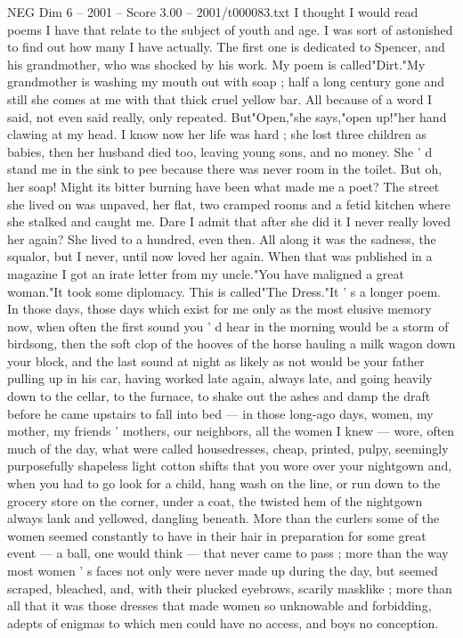 \begin{textsample}{NEG Dim 6 – 2001 – Score 3.00 – 2001/t000083.txt}  \label{ex:f6_neg_056}
I thought I would read poems I have that relate to the subject of youth and age.
I was sort of astonished to find out how many I have actually.
The first one is dedicated to Spencer, and his grandmother, who was shocked by his work.
My poem is called"Dirt."My grandmother is washing my mouth out with soap ; half a long century gone and still she comes at me with that thick cruel yellow bar.
All because of a word I said, not even said really, only repeated.
But"Open,"she says,"open up!"her hand clawing at my head.
I know now her life was hard ; she lost three children as babies, then her husband died too, leaving young sons, and no money.
She ' d stand me in the sink to pee because there was never room in the toilet.
But oh, her soap!
Might its bitter burning have been what made me a poet?
The street she lived on was unpaved, her flat, two cramped rooms and a fetid kitchen where she stalked and caught me.
Dare I admit that after she did it I never really loved her again?
She lived to a hundred, even then.
All along it was the sadness, the squalor, but I never, until now loved her again.
When that was published in a magazine I got an irate letter from my uncle."You have maligned a great woman."It took some diplomacy.
This is called"The Dress."It ' s a longer poem.
In those days, those days which exist for me only as the most elusive memory now, when often the first sound you ' d hear in the morning would be a storm of birdsong, then the soft clop of the hooves of the horse hauling a milk wagon down your block, and the last sound at night as likely as not would be your father pulling up in his car, having worked late again, always late, and going heavily down to the cellar, to the furnace, to shake out the ashes and damp the draft before he came upstairs to fall into bed — in those long-ago days, women, my mother, my friends ' mothers, our neighbors, all the women I knew — wore, often much of the day, what were called housedresses, cheap, printed, pulpy, seemingly purposefully shapeless light cotton shifts that you wore over your nightgown and, when you had to go look for a child, hang wash on the line, or run down to the grocery store on the corner, under a coat, the twisted hem of the nightgown always lank and yellowed, dangling beneath.
More than the curlers some of the women seemed constantly to have in their hair in preparation for some great event — a ball, one would think — that never came to pass ; more than the way most women ' s faces not only were never made up during the day, but seemed scraped, bleached, and, with their plucked eyebrows, scarily masklike ; more than all that it was those dresses that made women so unknowable and forbidding, adepts of enigmas to which men could have no access, and boys no conception.

\end{textsample}
